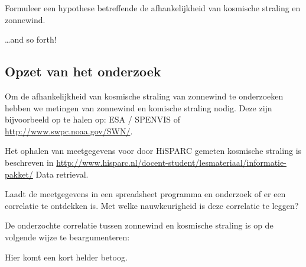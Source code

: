\begin{questions}

\question Formuleer een hypothese betreffende de afhankelijkheid van
kosmische straling en zonnewind.
\begin{solution}
  \ldots{}and so forth!
\end{solution}


\begin{EnvUplevel}
\section{Opzet van het onderzoek}

Om de afhankelijkheid van kosmische straling van zonnewind te onderzoeken
hebben we metingen van zonnewind en komische straling nodig. Deze zijn
bijvoorbeeld op te halen op: ESA / SPENVIS of
\url{http://www.swpc.noaa.gov/SWN/}.

Het ophalen van meetgegevens voor door HiSPARC gemeten kosmische straling
is beschreven in
\url{http://www.hisparc.nl/docent-student/lesmateriaal/informatie-pakket/} Data
retrieval.

Laadt de meetgegevens in een spreadsheet programma en onderzoek of er een
correlatie te ontdekken is. Met welke nauwkeurigheid is deze correlatie te
leggen?
\end{EnvUplevel}



\question De onderzochte correlatie tussen zonnewind en kosmische straling
is op de volgende wijze te beargumenteren:
\begin{solution}
  Hier komt een kort helder betoog.
\end{solution}


\end{questions}

